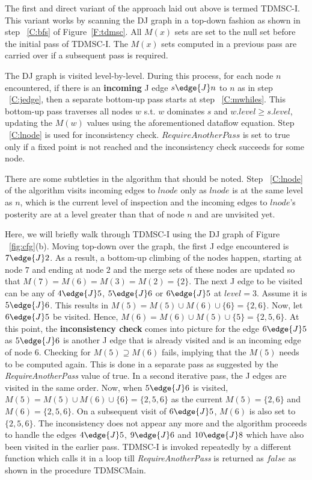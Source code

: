 The first and direct variant of the approach laid out above is termed TDMSC-I. This variant works by scanning the DJ graph in a top-down fashion as shown in step ~\ref{C:bfs}
of Figure~\ref{F:tdmsc}. All $M(x)$ sets are set to the null set before the initial pass of TDMSC-I. The $M(x)$ sets computed in a previous pass are carried over if a subsequent pass is required. 

The DJ graph is visited
level-by-level. During this process, for each node $n$ encountered, if there is an {\bf incoming}
J edge $s \edge{J} n$ to $n$ as in step ~\ref{C:jedge}, then a separate bottom-up pass starts at 
step ~\ref{C:mwhiles}. This bottom-up pass traverses all nodes $w$ s.t. $w$ dominates $s$ and $w.level \geq s.level$,
updating the $M(w)$ values using the aforementioned dataflow equation. Step ~\ref{C:lnode} is used for
inconsistency check. $RequireAnotherPass$ is set to true only if a fixed point is not reached
and the inconsistency check succeeds for some node.

There are some subtleties in the algorithm that should be noted. Step ~\ref{C:lnode} of the algorithm visits incoming edges to $lnode$ only as $lnode$ is at the same level as $n$, which is the current level of inspection and the incoming edges to $lnode$'s posterity are at a level greater than that of node $n$ and are unvisited yet. 

Here, we will briefly walk through TDMSC-I using the DJ graph of Figure ~\ref{fig:cfg}(b). Moving top-down over the graph, the first J edge encountered is $7 \edge{J} 2$. As a result, a bottom-up climbing of the nodes happen, starting at node $7$ and
ending at node $2$ and the merge sets of these nodes are updated so that $M(7) = M(6) = M(3) = M(2) = \{2\}$. The next J edge
to be visited can be any of $4 \edge{J} 5$, $5 \edge{J} 6$ or $6 \edge{J} 5$ at $level = 3$. Assume it is $5 \edge{J} 6$. This results in $M(5) = M(5) \cup M(6) \cup \{6\} = \{2,6\}$. Now, let $6 \edge{J} 5$ be visited. Hence, $M(6) = M(6) \cup M(5) \cup \{5\} = \{2,5,6\}$. At this point, the {\bf inconsistency check} comes into picture for the edge $6 \edge{J} 5$ as $5 \edge{J} 6$ is another J edge that is already visited and is an incoming edge of node $6$. Checking for $M(5) \supseteq M(6)$ fails, implying that the $M(5)$ needs to be computed again. This is done in a separate pass as suggested by the {\it RequireAnotherPass} value of true. In a second iterative pass, the J edges are visited in the same order. Now, when $5 \edge{J} 6$ is visited, 
$M(5) = M(5) \cup M(6) \cup \{6\} = \{2,5,6\}$ as 
the current $M(5) = \{2,6\}$ 
and $M(6) = \{2,5,6\}$. On a subsequent visit of $6 \edge{J} 5$, $M(6)$ is also set to $\{2,5,6\}$. The inconsistency does not appear any more and the algorithm proceeds to handle the edges $4 \edge{J} 5$, $9 \edge{J} 6$ and $10 \edge{J} 8$ which have
also been visited in the earlier pass. TDMSC-I is invoked repeatedly by a different function
which calls it in a loop till {\it RequireAnotherPass} is returned as $false$ as shown in the procedure TDMSCMain.

